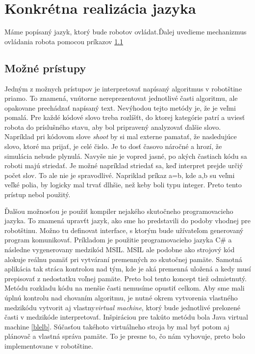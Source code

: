 \section {Konkrétna realizácia jazyka}
Máme popísaný jazyk, ktorý bude robotov ovládat.Ďalej uvedieme mechanizmus ovládania robota pomocou príkazov \ref{} 
\subsection{Možné prístupy}
Jedným z možnych prístupov je interpretovať napísaný algoritmus v robotštine priamo. To znamená, vnútorne nereprezentovat jednotlivé časti algoritmu, ale opakovane prechádzať napísaný text. Nevýhodou tejto metódy je, že je veľmi pomalá. Pre každé kódové slovo treba rozlíšťt, do ktorej kategórie patrí a uviesť robota do príslušného  stavu, aby bol pripravený analyzovať ďalšie slovo. Napríklad pri kódovom slove {\it shoot} by si mal externe pamatať, že nasledujúce slovo, ktoré ma prijať, je celé čislo. Je to dosť časovo náročné a hrozí, že simulácia nebude plynulá. Navyše nie je vopred jasné, po akých častiach kódu sa roboti majú striedať. Je možné napríklad striedať sa, keď interpret prejde určiý počet slov. To ale nie je spravodlivé. Napriklad príkaz a=b, kde a,b su veľmi veľké polia, by logicky mal trvať dlhšie,  než keby boli typu integer. Preto tento prístup  nebol použitý.

Ďalšou možnosťou je použiť kompiler nejakého skutočneho programovacieho jazyka. To znamená upravťt jazyk, ako sme ho predstavili do podoby vhodnej pre robotštinu. Možno tu definovat interface, s ktorým bude užívateľom generovaný program komunikovať. Príkladom je použitie programovacieho jazyka C\# a následne vygenerovany medzikód MSIL. MSIL ale podobne ako strojový kód alokuje reálnu pamäť pri vytváraní premenných zo skutočnej pamäte.  Samotná aplikácia tak stráca kontrolou nad tým, kde je aká premenná uložená a kedy musí prepisovať z nedostatku voľnej pamäte. Preto bol tento koncept tiež odmietnutý.\\
Metódu rozkladu kódu na menšie časti nemusíme opustiť celkom. Aby sme mali úplnú kontrolu nad chovaním algoritmu, je nutné okrem vytvorenia vlastného medzikódu vytvorit aj vlastny{\it virtual machine}, ktorý bude jednotlivé prelozené časti v medzikóde interpretovať. Inšpiráciou pre takúto metódu bola Java virtual machine \ref{blelb}. Súčasťou takéhoto virtuálneho stroja by mal byť potom aj plánovač a vlastná správa pamäte. To je  presne to, čo nám vyhovuje, preto bolo implementovane v robotštine.\\ %


